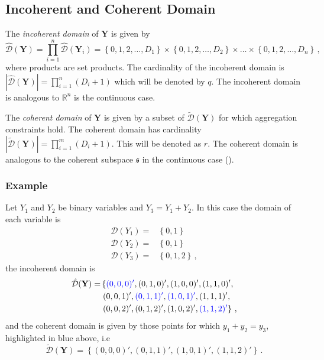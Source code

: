 \documentclass[a4paper,review,12pt,authoryear]{elsarticle}
\newcommand{\bY}{\mathbf{Y}}
\begin{document}
	\subsection{Incoherent and Coherent Domain}
	The \textit{incoherent domain} of $\bY$ is given by
	\[
	\hat{\mathcal D}(\bY)=\prod\limits_{i=1}^n\hat{\mathcal D}(\bY_i)=\left\{0, 1,2,\dots,D_1\right\}\times\left\{0,1,2,\dots,D_2\right\}\times\dots\times\left\{0,1,2,\dots,D_n\right\}\,,
	\] 
  where products are set products. The cardinality of the incoherent domain is $|\hat{\mathcal D}(\bY)|=\prod\limits_{i=1}^{n} (D_i+1)$ which will be denoted by $q$. 
  The incoherent domain is analogous to $\mathbb{R}^n$ is the continuous case.
    
  The \textit{coherent domain} of $\bY$ is given by a subset of $\tilde{\mathcal D}(\bY)$ for which aggregation constraints hold.  
  The coherent domain has cardinality $|\tilde{\mathcal D}(\bY)|=\prod\limits_{i=1}^{m} (D_i+1)$. This will be denoted as $r$. 
  The coherent domain is analogous to the coherent subspace $\mathfrak{s}$ in the continuous case (\citealp{panagiotelisProbabilisticForecastReconciliation2022}).
    
    \subsubsection*{Example}
    \label{sec:example}
    
    Let $Y_1$ and $Y_2$ be binary variables and $Y_3=Y_1+Y_2$. In this case the domain of each variable is
    \begin{align*}
      \mathcal{D}(Y_1)=&\left\{0,1\right\}\\
      \mathcal{D}(Y_2)=&\left\{0,1\right\}\\
      \mathcal{D}(Y_3)=&\left\{0,1,2\right\}\,,
    \end{align*}	
    the incoherent domain is
    \begin{align*}
    \hat{\mathcal D}(\bY)=&\left\{\textcolor{blue}{(0,0,0)'},(0,1,0)',(1,0,0)',(1,1,0)',\right.\\
    &\left.(0,0,1)',\textcolor{blue}{(0,1,1)'},\textcolor{blue}{(1,0,1)'},(1,1,1)',\right.\\
    &\left.(0,0,2)',(0,1,2)',(1,0,2)',\textcolor{blue}{(1,1,2)'}\right\}\,,
    \end{align*}
    and the coherent domain is given by those points for which $y_1+y_2=y_3$, highlighted in blue above, i.e
    \[
        \tilde{\mathcal D}(\bY)=\left\{(0,0,0)',(0,1,1)',(1,0,1)',(1,1,2)'\right\}\,.
    \]
    
\end{document}
